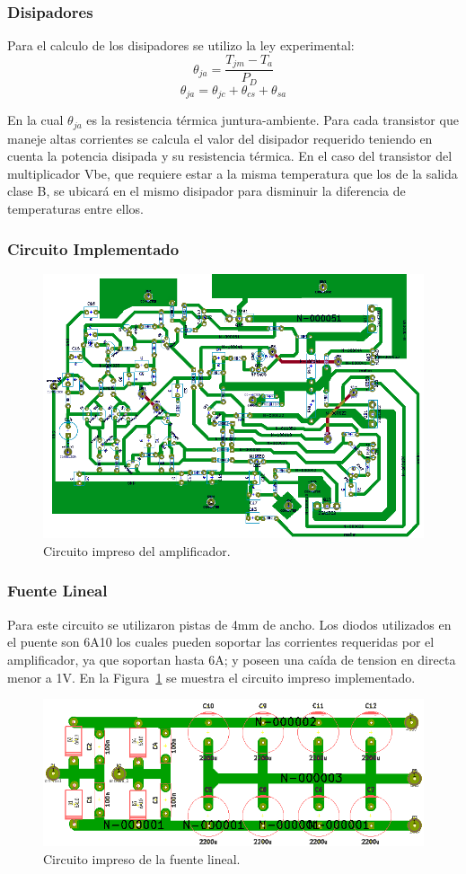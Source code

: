 \subsubsection{Disipadores}
\bigskip
Para el calculo de los disipadores se utilizo la ley experimental:
$$
   \theta_{ja}=\dfrac{T_{jm}-T_a}{P_D}
$$
$$
	\theta_{ja}=\theta_{jc}+\theta_{cs}+\theta_{sa}
$$

En la cual $\theta_{ja}$ es la resistencia térmica juntura-ambiente. Para cada transistor que maneje altas corrientes se calcula el valor del disipador requerido teniendo en cuenta la potencia disipada y su resistencia térmica. En el caso del transistor del multiplicador Vbe, que requiere estar a la misma temperatura que los de la salida clase B, se ubicará en el mismo disipador para disminuir la diferencia de temperaturas entre ellos.

\subsubsection{Circuito Implementado}
\begin{figure}[H]
\centerline{
\includegraphics[width=1\textwidth]{img/circuito_implementado_todo.png}}
\caption{Circuito impreso del amplificador.}
\end{figure}

\subsubsection{Fuente Lineal}
\medskip
Para este circuito se utilizaron pistas de 4mm de ancho. Los diodos utilizados en el puente son 6A10 los cuales pueden soportar las corrientes requeridas por el amplificador, ya que soportan hasta 6A; y poseen una caída de tension en directa menor a 1V.
En la Figura~\ref{circuito_impreso_fuente_lineal} se muestra el circuito impreso implementado. 

\begin{figure}[H]
\centering
\centerline{\includegraphics[width=1\textwidth]{img/circuito_impreso_fuente_lineal.png}}
\caption{Circuito impreso de la fuente lineal.}
\label{circuito_impreso_fuente_lineal} 
\end{figure}
